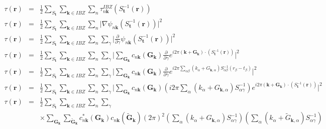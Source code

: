 \documentclass[a4paper,12pt]{report}
\begin{document}
\begin{eqnarray}
\tau(\mathbf{r}) &=& \frac{1}{2} \sum_{S_{\mathbf{t}}} \sum_{\mathbf{k} \in IBZ} \sum_n \tau^{IBZ}_{n\mathbf{k}} (S_{\mathbf{t}}^{-1} (\mathbf{r})) \nonumber\\
\tau(\mathbf{r}) &=& \frac{1}{2} \sum_{S_{\mathbf{t}}} \sum_{\mathbf{k} \in IBZ} \sum_n \vert \nabla \psi_{n\mathbf{k}} (S_{\mathbf{t}}^{-1} (\mathbf{r})) \vert^2  \nonumber\\
\tau(\mathbf{r}) &=& \frac{1}{2} \sum_{S_{\mathbf{t}}} \sum_{\mathbf{k} \in IBZ} \sum_n \sum_{\gamma} \biggl\vert \frac{\partial}{\partial \gamma} \psi_{n\mathbf{k}} (S_{\mathbf{t}}^{-1} (\mathbf{r})) \biggl\vert^2  \nonumber\\
\tau(\mathbf{r}) &=& \frac{1}{2} \sum_{S_{\mathbf{t}}} \sum_{\mathbf{k} \in IBZ} \sum_n \sum_{\gamma} \biggl\vert \sum_{\mathbf{G}_{\mathbf{k}}} c_{n\mathbf{k}}(\mathbf{G}_{\mathbf{k}}) \frac{\partial}{\partial \gamma} e^{i2\pi \left( \mathbf{k} + \mathbf{G}_{\mathbf{k}}\right)\cdotp \left( S_{\mathbf{t}}^{-1} (\mathbf{r})\right) } \biggl\vert^2 \nonumber\\
\tau(\mathbf{r}) &=& \frac{1}{2} \sum_{S_{\mathbf{t}}} \sum_{\mathbf{k} \in IBZ} \sum_n \sum_{\gamma} \biggl\vert \sum_{\mathbf{G}_{\mathbf{k}}} c_{n\mathbf{k}}(\mathbf{G}_{\mathbf{k}}) \frac{\partial}{\partial \gamma} e^{i2\pi \sum_{\alpha \beta} \left( k_{\alpha} + G_{\mathbf{k},\alpha}\right) S_{\alpha\beta}^{-1} (r_{\beta}-t_{\beta}) } \biggl\vert^2 \nonumber\\
\tau(\mathbf{r}) &=& \frac{1}{2} \sum_{S_{\mathbf{t}}} \sum_{\mathbf{k} \in IBZ} \sum_n \sum_{\gamma} \biggl\vert \sum_{\mathbf{G}_{\mathbf{k}}} c_{n\mathbf{k}}(\mathbf{G}_{\mathbf{k}}) \left(i2\pi \sum_{\alpha}\left( k_{\alpha} + G_{\mathbf{k},\alpha}\right) S_{\alpha\gamma}^{-1} \right) e^{i2\pi \left(\mathbf{k}+ \mathbf{G}_{\mathbf{k}}\right) \cdotp \left( S_{\mathbf{t}}^{-1} (\mathbf{r}) \right)} \biggl\vert^2 \nonumber\\
\tau(\mathbf{r}) &=& \frac{1}{2} \sum_{S_{\mathbf{t}}} \sum_{\mathbf{k} \in IBZ} \sum_n \sum_{\gamma} \nonumber \\
&&\times \sum_{\mathbf{G}_{\mathbf{k}}} \sum_{\tilde{\mathbf{G}}_{\mathbf{k}}} c_{n\mathbf{k}}^{*}(\mathbf{G}_{\mathbf{k}}) c_{n\mathbf{k}}(\tilde{\mathbf{G}}_{\mathbf{k}}) (2\pi)^2 \left(\sum_{\alpha}\left( k_{\alpha} + G_{\mathbf{k},\alpha}\right) S_{\alpha\gamma}^{-1} \right) \left(\sum_{\alpha}\left( k_{\alpha} + \tilde{G}_{\mathbf{k},\alpha}\right) S_{\alpha\gamma}^{-1} \right) \nonumber \\

\end{eqnarray}
\end{document}
